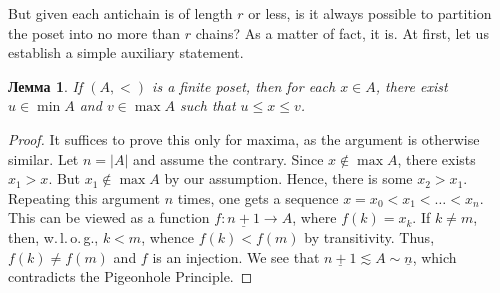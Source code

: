 \documentclass[12pt,notitlepage]{article}
\theoremstyle{plain}
\newtheorem{lemma}[thm]{Лемма}
\theoremstyle{definition}
\theoremstyle{plain}
\newcommand{\ul}[1]{\underline{#1}}
\newcommand{\1}{\mathbf{1}}
\newcommand{\0}{\mathbf{0}}
\begin{document}
But given each antichain is of length $r$ or less, is it always possible to partition the poset into no more than $r$ chains? As a matter of fact, it is. At first, let us establish a simple auxiliary statement.

\begin{lemma}\label{L13:fin_min}
	If $(A, <)$ is a finite poset, then for each $x \in A$, there exist $u \in \min A$ and $v \in \max A$ such that $u \leq x \leq v$.
\end{lemma}
\begin{proof}
	It suffices to prove this only for maxima, as the argument is otherwise similar. Let $n = |A|$ and assume the contrary. Since $x \notin \max A$, there exists $x_1 > x$. But $x_1 \notin \max A$ by our assumption. Hence, there is some $x_2 > x_1$. Repeating this argument $n$ times, one gets a sequence $x = x_0 < x_1 < \ldots < x_n$. This can be viewed as a function $f\colon \ul{n + 1} \to A$, where $f(k) = x_k$. If $k \neq m$, then, w.\,l.\,o.\,g., $k < m$, whence $f(k) < f(m)$ by transitivity. Thus, $f(k) \neq f(m)$ and $f$ is an injection. We see that $\ul{n + 1} \lesssim A \sim \ul{n}$, which contradicts the Pigeonhole Principle.
\end{proof}
\end{document}
